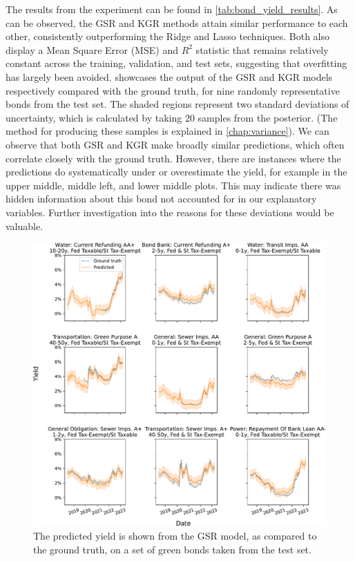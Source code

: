 The results from the experiment can be found in \cref{tab:bond_yield_results}. As can be observed, the GSR and KGR methods attain similar performance to each other, consistently outperforming the Ridge and Lasso techniques. Both also display a Mean Square Error (MSE) and $R^2$ statistic that remains relatively constant across the training, validation, and test sets, suggesting that overfitting has largely been avoided.  showcases the output of the GSR and KGR models respectively compared with the ground truth, for nine randomly representative bonds from the test set. The shaded regions represent two standard deviations of uncertainty, which is calculated by taking 20 samples from the posterior. (The method for producing these samples is explained in \cref{chap:variance}). We can observe that both GSR and KGR make broadly similar predictions, which often correlate closely with the ground truth. However, there are instances where the predictions do systematically under or overestimate the yield, for example in the upper middle, middle left, and lower middle plots. This may indicate there was hidden information about this bond not accounted for in our explanatory variables. Further investigation into the reasons for these deviations would be valuable.

\begin{figure}[t]  
    \begin{center}
        \includegraphics[width=\linewidth]{Figures/yield_predictions_GSR.pdf}
    \end{center}
   \caption[The output of the GSR model on several green bonds from the test set]{The predicted yield is shown from the GSR model, as compared to the ground truth, on a set of green bonds taken from the test set. } 
    \label{fig:yield_predictions_GSR}
\end{figure} 



